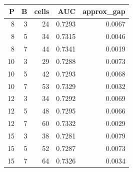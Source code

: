 \begin{tabular}{rrrrr}
\toprule
P & B & cells & AUC & approx_gap \\
\midrule
8 & 3 & 24 & 0.7293 & 0.0067 \\
8 & 5 & 34 & 0.7315 & 0.0046 \\
8 & 7 & 44 & 0.7341 & 0.0019 \\
10 & 3 & 29 & 0.7288 & 0.0073 \\
10 & 5 & 42 & 0.7293 & 0.0068 \\
10 & 7 & 53 & 0.7329 & 0.0032 \\
12 & 3 & 34 & 0.7292 & 0.0069 \\
12 & 5 & 48 & 0.7295 & 0.0066 \\
12 & 7 & 60 & 0.7332 & 0.0029 \\
15 & 3 & 38 & 0.7281 & 0.0079 \\
15 & 5 & 52 & 0.7287 & 0.0073 \\
15 & 7 & 64 & 0.7326 & 0.0034 \\
\bottomrule
\end{tabular}
